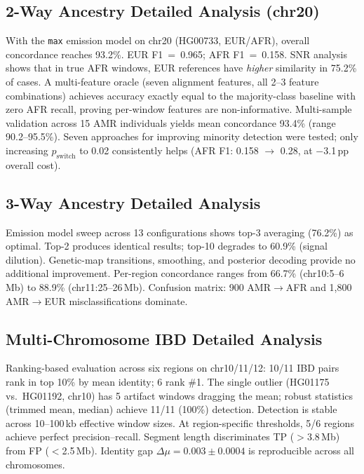 \documentclass[11pt]{article}
\begin{document}
\subsection{2-Way Ancestry Detailed Analysis (chr20)}
\label{sec:supp_2way_ancestry}

With the \texttt{max} emission model on chr20 (HG00733, EUR/AFR), overall concordance reaches 93.2\%. EUR F1~=~0.965; AFR F1~=~0.158. SNR analysis shows that in true AFR windows, EUR references have \emph{higher} similarity in 75.2\% of cases. A multi-feature oracle (seven alignment features, all 2--3 feature combinations) achieves accuracy exactly equal to the majority-class baseline with zero AFR recall, proving per-window features are non-informative. Multi-sample validation across 15 AMR individuals yields mean concordance 93.4\% (range 90.2--95.5\%). Seven approaches for improving minority detection were tested; only increasing $p_{\text{switch}}$ to 0.02 consistently helps (AFR F1: 0.158 $\rightarrow$ 0.28, at $-$3.1\,pp overall cost).

\subsection{3-Way Ancestry Detailed Analysis}
\label{sec:supp_3way_detail}

Emission model sweep across 13 configurations shows top-3 averaging (76.2\%) as optimal. Top-2 produces identical results; top-10 degrades to 60.9\% (signal dilution). Genetic-map transitions, smoothing, and posterior decoding provide no additional improvement. Per-region concordance ranges from 66.7\% (chr10:5--6\,Mb) to 88.9\% (chr11:25--26\,Mb). Confusion matrix: 900 AMR$\rightarrow$AFR and 1,800 AMR$\rightarrow$EUR misclassifications dominate.

\subsection{Multi-Chromosome IBD Detailed Analysis}
\label{sec:supp_multi_chr_ibd}

Ranking-based evaluation across six regions on chr10/11/12: 10/11 IBD pairs rank in top 10\% by mean identity; 6 rank \#1. The single outlier (HG01175 vs.\ HG01192, chr10) has 5 artifact windows dragging the mean; robust statistics (trimmed mean, median) achieve 11/11 (100\%) detection. Detection is stable across 10--100\,kb effective window sizes. At region-specific thresholds, 5/6 regions achieve perfect precision--recall. Segment length discriminates TP ($>$3.8\,Mb) from FP ($<$2.5\,Mb). Identity gap $\Delta\mu = 0.003 \pm 0.0004$ is reproducible across all chromosomes.
\end{document}
